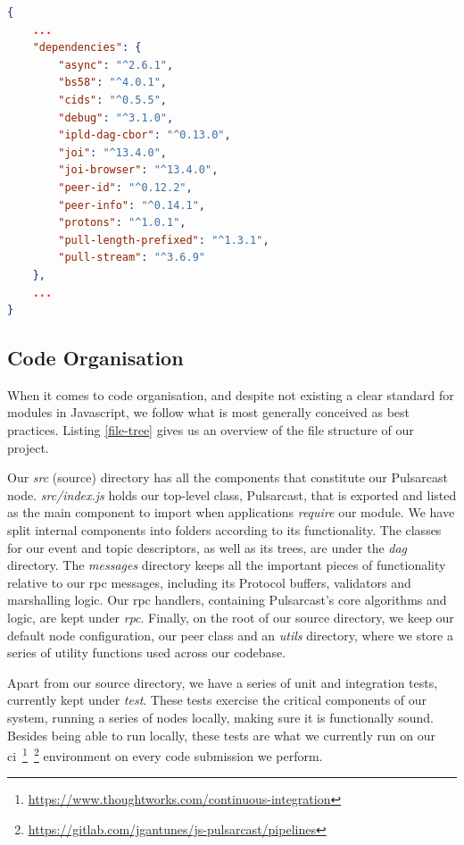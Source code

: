 \begin{lstlisting}[language=JSON, float, caption={Pulsarcast module dependency list},label={dependencies}]
{
	...
	"dependencies": {
		"async": "^2.6.1",
		"bs58": "^4.0.1",
		"cids": "^0.5.5",
		"debug": "^3.1.0",
		"ipld-dag-cbor": "^0.13.0",
		"joi": "^13.4.0",
		"joi-browser": "^13.4.0",
		"peer-id": "^0.12.2",
		"peer-info": "^0.14.1",
		"protons": "^1.0.1",
		"pull-length-prefixed": "^1.3.1",
		"pull-stream": "^3.6.9"
	},
	...
}
\end{lstlisting}

\subsection{Code Organisation}\label{subsec:code-organisation}

When it comes to code organisation, and despite not existing a clear standard
for modules in Javascript, we follow what is most generally conceived as best
practices. Listing \ref{file-tree} gives us an overview of the file structure
of our project. 

Our \emph{src} (source) directory has all the components that constitute our
Pulsarcast node. \emph{src/index.js} holds our top-level class, Pulsarcast,
that is exported and listed as the main component to import when applications
\emph{require} our module. We have split internal components into folders
according to its functionality. The classes for our event and topic
descriptors, as well as its trees, are under the \emph{dag} directory. The
\emph{messages} directory keeps all the important pieces of functionality
relative to our \acrshort{rpc} messages, including its Protocol buffers,
validators and marshalling logic. Our \acrshort{rpc} handlers, containing
Pulsarcast's core algorithms and logic, are kept under \emph{rpc}. Finally, on
the root of our source directory, we keep our default node configuration, our
peer class and an \emph{utils} directory, where we store a series of utility
functions used across our codebase.

Apart from our source directory, we have a series of unit and integration
tests, currently kept under \emph{test}. These tests exercise the critical
components of our system, running a series of nodes locally, making sure it is
functionally sound. Besides being able to run locally, these tests are what we
currently run on our
\acrfull{ci}~\footnote{\url{https://www.thoughtworks.com/continuous-integration}}~\footnote{\url{https://gitlab.com/jgantunes/js-pulsarcast/pipelines}}
environment on every code submission we perform.

